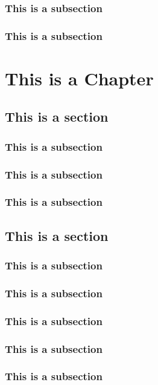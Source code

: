 \documentclass[11pt,oneside]{book}
\begin{document}
\subsection{This is a subsection}
\subsection{This is a subsection}

\chapter{This is a Chapter}

\section{This is a section}

\subsection{This is a subsection}
\subsection{This is a subsection}
\subsection{This is a subsection}

\section{This is a section}

\subsection{This is a subsection}
\subsection{This is a subsection}
\subsection{This is a subsection}
\subsection{This is a subsection}
\subsection{This is a subsection}
\end{document}
